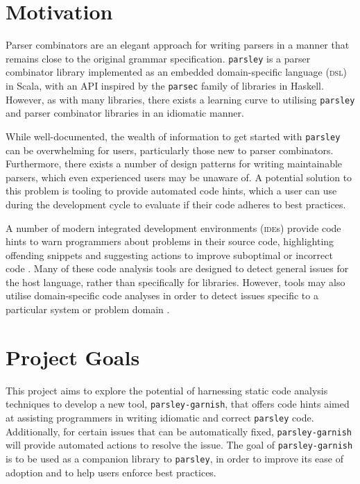 \documentclass[../../main.tex]{subfiles}
\begin{document}

\section{Motivation}
Parser combinators \cite{hutton_higher-order_1992} are an elegant approach for writing parsers in a manner that remains close to the original grammar specification.
\texttt{parsley} \cite{willis_garnishing_2018} is a parser combinator library implemented as an embedded domain-specific language (\textsc{dsl}) \cite{hudak_building_1996} in Scala, with an API inspired by the \texttt{parsec} \cite{leijen_parsec_2001} family of libraries in Haskell.
However, as with many libraries, there exists a learning curve to utilising \texttt{parsley} and parser combinator libraries in an idiomatic manner.

While well-documented, the wealth of information to get started with \texttt{parsley} can be overwhelming for users, particularly those new to parser combinators.
Furthermore, there exists a number of design patterns \cite{willis_design_2022} for writing maintainable parsers, which even experienced users may be unaware of.
A potential solution to this problem is tooling to provide automated code hints, which a user can use during the development cycle to evaluate if their code adheres to best practices.


A number of modern integrated development environments (\textsc{ide}s) provide code hints to warn programmers about problems in their source code, highlighting offending snippets and suggesting actions to improve suboptimal or incorrect code \cite{kurbatova_intellij_2021}.
Many of these code analysis tools are designed to detect general issues for the host language, rather than specifically for libraries.
However, tools may also utilise domain-specific code analyses in order to detect issues specific to a particular system or problem domain \cite{renggli_domain-specific_2010,gregor_stllint_2006}.

\section{Project Goals}
This project aims to explore the potential of harnessing static code analysis techniques to develop a new tool, \texttt{parsley-garnish}, that offers code hints aimed at assisting programmers in writing idiomatic and correct \texttt{parsley} code.
Additionally, for certain issues that can be automatically fixed, \texttt{parsley-garnish} will provide automated actions to resolve the issue. %
The goal of \texttt{parsley-garnish} is to be used as a companion library to \texttt{parsley}, in order to improve its ease of adoption and to help users enforce best practices.
\end{document}
